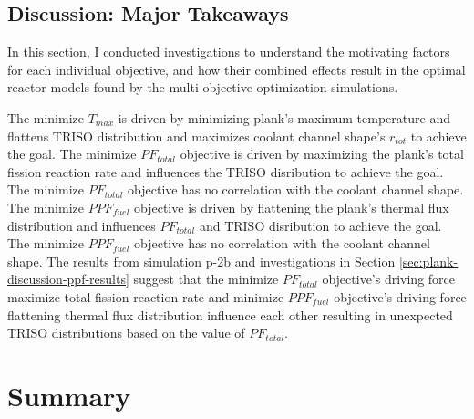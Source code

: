 \subsection{Discussion: Major Takeaways}
In this section, I conducted investigations to understand the motivating factors for 
each individual objective, and how their combined effects result in the optimal 
reactor models found by the multi-objective optimization simulations. 

The minimize $T_{max}$ is driven by minimizing plank's maximum temperature and flattens 
TRISO distribution and maximizes coolant channel shape's $r_{tot}$ to achieve the goal. 
The minimize $PF_{total}$ objective is driven by maximizing the plank's total fission 
reaction rate and influences the TRISO disribution to achieve the goal. 
The minimize $PF_{total}$ objective has no correlation with the coolant channel shape. 
The minimize $PPF_{fuel}$ objective is driven by flattening the plank's thermal flux
distribution and influences $PF_{total}$ and TRISO disribution to achieve the goal. 
The minimize $PPF_{fuel}$ objective has no correlation with the coolant channel shape. 
The results from simulation p-2b and investigations in Section 
\ref{sec:plank-discussion-ppf-results} suggest that the minimize $PF_{total}$ 
objective's driving force maximize total fission reaction rate and 
minimize $PPF_{fuel}$ objective's driving force flattening thermal flux distribution 
influence each other resulting in unexpected TRISO distributions based 
on the value of $PF_{total}$. 


\section{Summary}


